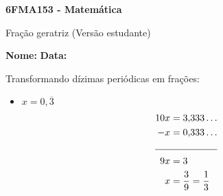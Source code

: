 \documentclass[a4paper,14pt]{article}
\begin{document}
	
	\noindent\textbf{6FMA153 - Matemática} 
	
	\begin{center}Fração geratriz (Versão estudante)
	\end{center}
	
	\noindent\textbf{Nome:} \underline{\hspace{10cm}}
	\noindent\textbf{Data:} \underline{\hspace{4cm}}
	
	
	\begin{multicols}{2}
	    \noindent Transformando dízimas periódicas em frações: \\
	    \begin{itemize}
	    	\item $x = 0,\overline{3}$
	    	\begin{align*}
	    		10x &= 3{,}333\ldots \\
	    		-x &= 0{,}333\ldots \\
	    		\cline{1-2}
	    		9x &= 3 \\
	    		x &= \frac{3}{9} = \frac{1}{3}
	    	\end{align*}
	    	

\end{itemize}
\end{multicols}
\end{document}
